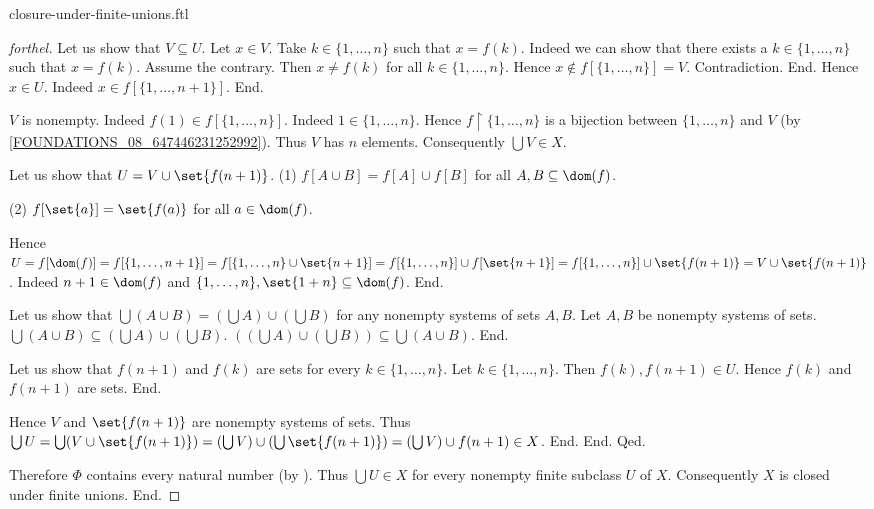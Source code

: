 \documentclass{naproche-library}
\begin{document}
\begin{smodule}{closure-under-finite-unions.ftl}
\begin{proof}[forthel]
            Let us show that $V \subseteq U$.
              Let $x \in V$.
              Take $k \in \{ 1, \dots, n \}$ such that $x = f(k)$.
              Indeed we can show that there exists a $k \in \{ 1, \dots, n \}$ such that $x = f(k)$.
                Assume the contrary.
                Then $x \neq f(k)$ for all $k \in \{ 1, \dots, n \}$.
                Hence $x \notin f[\{ 1, \dots, n \}] = V$.
                Contradiction.
              End.
              Hence $x \in U$.
              Indeed $x \in f[\{ 1, \dots, n + 1 \}]$.
            End.

            $V$ is nonempty.
            Indeed $f(1) \in f[\{ 1, \dots, n \}]$.
            Indeed $1 \in \{ 1, \dots, n \}$.
            Hence $f \restriction \{ 1, \dots, n \}$ is a bijection between $\{ 1, \dots, n \}$ and $V$ (by \cref{FOUNDATIONS_08_647446231252992}).
            Thus $V$ has $n$ elements.
            Consequently $\bigcup V \in X$.

            Let us show that $U = V \cup \set{f(n + 1)}$. \newline
              (1) $f[A \cup B] = f[A] \cup f[B]$ for all $A, B \subseteq \dom(f)$.

              (2) $f[\set{a}] = \set{f(a)}$ for all $a \in \dom(f)$.

              Hence $U
                = f[\dom(f)]
                = f[\{ 1, \dots, n + 1 \}]
                = f[\{ 1, \dots, n \} \cup \set{n + 1}]
                = f[\{ 1, \dots, n \}] \cup f[\set{n + 1}]
                = f[\{ 1, \dots, n \}] \cup \set{f(n + 1)}
                = V \cup \set{f(n + 1)}$.
              Indeed $n + 1 \in \dom(f)$ and $\{ 1, \dots, n \}, \set{1 + n} \subseteq \dom(f)$.
            End.

            Let us show that $\bigcup (A \cup B) = (\bigcup A) \cup (\bigcup B)$ for any nonempty systems of sets $A, B$.
              Let $A, B$ be nonempty systems of sets.
              $\bigcup (A \cup B) \subseteq (\bigcup A) \cup (\bigcup B)$.
              $((\bigcup A) \cup (\bigcup B)) \subseteq \bigcup (A \cup B)$. %
            End.

            Let us show that $f(n + 1)$ and $f(k)$ are sets for every $k \in \{ 1, \dots, n \}$.
              Let $k \in \{ 1, \dots, n \}$.
              Then $f(k), f(n + 1) \in U$.
              Hence $f(k)$ and $f(n + 1)$ are sets.
            End.

            Hence $V$ and $\set{f(n + 1)}$ are nonempty systems of sets.
            Thus $\bigcup U
              = \bigcup (V \cup \set{f(n + 1)})
              = (\bigcup V) \cup (\bigcup \set{f(n + 1)})
              = (\bigcup V) \cup f(n + 1)
              \in X$.
          End.
        End.
      Qed.

      Therefore $\Phi$ contains every natural number (by ).
      Thus $\bigcup U \in X$ for every nonempty finite subclass $U$ of $X$.
      Consequently $X$ is closed under finite unions.
    End.
  \end{proof}
\end{smodule}
\end{document}
